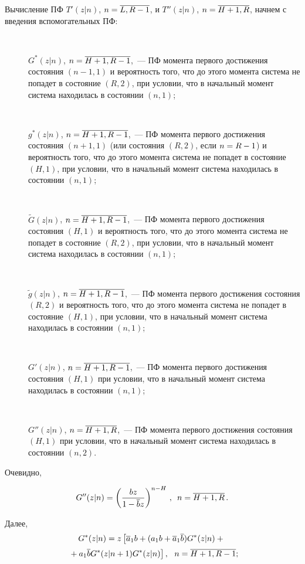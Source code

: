 \begin{multicols}{2}
Вычисление ПФ $T'(z|n)$, $n\hm=\overline{L,R-1}$,
и $T''(z|n)$, $n\hm=\overline{H+1,R}$, начнем с введения вспомогательных ПФ:
\begin{description}
\item[\,]
$G^*(z|n)$, $n\hm=\overline{H+1,R-1}$,~--- ПФ момента
первого достижения состояния $(n-1,1)$ и
вероятность того, что до этого момента система
не попадет в состояние $(R,2)$, при условии,
что в начальный момент система находилась в
состоянии $(n,1)$;\\[-9pt]
\item[\,]
$g^*(z|n)$, $n\hm=\overline{H+1,R-1}$,~--- ПФ момента
первого достижения состояния $(n+1,1)$
(или состояния $(R,2)$, если $n\hm=R\hm-1$) и
вероятность того, что до этого момента система
не попадет в состояние $(H,1)$, при условии,
что в начальный момент система находилась в
состоянии $(n,1)$;\\[-9pt]
\item[\,]
$\tilde{G}(z|n)$, $n\hm=\overline{H+1,R-1}$,~--- ПФ момента
первого достижения состояния $(H,1)$ и
вероятность того, что до этого момента система
не попадет в состояние $(R,2)$, при условии,
что в начальный момент система находилась в
состоянии $(n,1)$;\\[-9pt]
\item[\,]
$\tilde{g}(z|n)$, $n\hm=\overline{H+1,R-1}$,~--- ПФ момента
первого достижения состояния $(R,2)$ и
вероятность того, что до этого момента система
не попадет в состояние $(H,1)$, при условии,
что в начальный момент система находилась в состоянии $(n,1)$;\\[-9pt]
\item[\,]
$G'(z|n)$, $n\hm=\overline{H+1,R-1}$,~--- ПФ момента
первого достижения состояния $(H,1)$ при условии,
что в начальный момент система находилась в состоянии $(n,1)$;\\[-9pt]
\item[\,]
$G''(z|n)$, $n\hm=\overline{H+1,R}$,~--- ПФ момента
первого достижения состояния $(H,1)$ при
условии, что в начальный момент система находилась в состоянии $(n,2)$.
\end{description}

Очевидно,

\noindent
\begin{equation*}
G''(z|n) = \left(\displaystyle\frac{\displaystyle b z\mathstrut}{\displaystyle  1 - \overline{b} z\mathstrut} \right)^{n-H}\,,\enskip n=\overline{H+1,R}\,.
\end{equation*}


Далее,
\begin{multline}
G^*(z|n) = z \left[ \overline{a}_1 b +
(a_1 b + \overline{a}_1 \overline{b}) G^*(z|n)
+{}\right.\\[2pt]
\hspace*{-1mm}\left.{}+ a_1 \overline{b} G^*(z|n+1) G^*(z|n) \right],\ \ n=\overline{H+1,R-1};\!\!\!
\label{5.2.19}
\end{multline}


\end{multicols}
